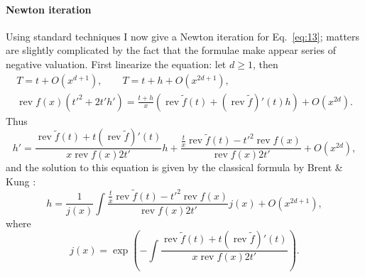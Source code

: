 \documentclass{article}
\DeclareMathOperator{\rev}{rev}
\begin{document}
\paragraph{Newton iteration}
Using standard techniques I now give a Newton iteration for
Eq.~\eqref{eq:13}; matters are slightly complicated by the fact that
the formulae make appear series of negative valuation. First linearize
the equation: let $d\ge1$, then
\begin{equation}
  \label{eq:17}
  \begin{gathered}
    T = t + O(x^{d+1}), \qquad T = t + h + O(x^{2d+1}),\\
    \rev f(x) \left({t'}^2 + 2t'h'\right) = \frac{t+h}{x}\left(\rev\tilde{f}(t) + (\rev\tilde{f})'(t)h\right) + O(x^{2d}).
  \end{gathered}
\end{equation}
Thus
\begin{equation}
  \label{eq:18}
  h' = \frac{\rev\tilde{f}(t) + t(\rev\tilde{f})'(t)}{x\rev f(x)2t'}h + 
  \frac{\frac{t}{x}\rev\tilde{f}(t) - {t'}^2\rev f(x)}{\rev f(x)2t'} +
  O(x^{2d}),
\end{equation}
and the solution to this equation is given by the classical formula by
Brent \& Kung \cite{brent+kung}:
\begin{equation}
  \label{eq:19}
  h = \frac{1}{j(x)} \int \frac{\frac{t}{x}\rev\tilde{f}(t) - {t'}^2\rev f(x)}{\rev f(x)2t'} j(x) + O(x^{2d+1}),
\end{equation}
where
\begin{equation}
  \label{eq:20}
  j(x) = \exp\left(-\int \frac{\rev\tilde{f}(t) + t(\rev\tilde{f})'(t)}{x\rev f(x)2t'}\right).
\end{equation}
\end{document}
